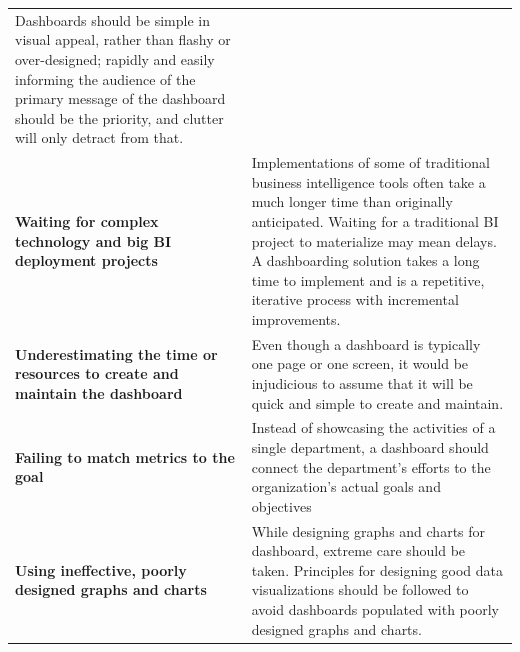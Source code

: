 \documentclass[]{book}
\begin{document}
\begin{longtable}[]{@{}ll@{}}
\begin{minipage}[t]{0.66\columnwidth}
Dashboards should be simple in visual appeal, rather than flashy or over-designed; rapidly and easily informing the audience of the primary message of the dashboard should be the priority, and clutter will only detract from that.\strut
\end{minipage}\tabularnewline
\begin{minipage}[t]{0.28\columnwidth}\raggedright
\textbf{Waiting for complex technology and big BI deployment projects}\strut
\end{minipage} & \begin{minipage}[t]{0.66\columnwidth}\raggedright
Implementations of some of traditional business intelligence tools often take a much longer time than originally anticipated. Waiting for a traditional BI project to materialize may mean delays. A dashboarding solution takes a long time to implement and is a repetitive, iterative process with incremental improvements.\strut
\end{minipage}\tabularnewline
\begin{minipage}[t]{0.28\columnwidth}\raggedright
\textbf{Underestimating the time or resources to create and maintain the dashboard}\strut
\end{minipage} & \begin{minipage}[t]{0.66\columnwidth}\raggedright
Even though a dashboard is typically one page or one screen, it would be injudicious to assume that it will be quick and simple to create and maintain.\strut
\end{minipage}\tabularnewline
\begin{minipage}[t]{0.28\columnwidth}\raggedright
\textbf{Failing to match metrics to the goal}\strut
\end{minipage} & \begin{minipage}[t]{0.66\columnwidth}\raggedright
Instead of showcasing the activities of a single department, a dashboard should connect the department's efforts to the organization's actual goals and objectives\strut
\end{minipage}\tabularnewline
\begin{minipage}[t]{0.28\columnwidth}\raggedright
\textbf{Using ineffective, poorly designed graphs and charts}\strut
\end{minipage} & \begin{minipage}[t]{0.66\columnwidth}\raggedright
While designing graphs and charts for dashboard, extreme care should be taken. Principles for designing good data visualizations should be followed to avoid dashboards populated with poorly designed graphs and charts.\strut
\end{minipage}\tabularnewline
\bottomrule
\end{longtable}
\end{document}
